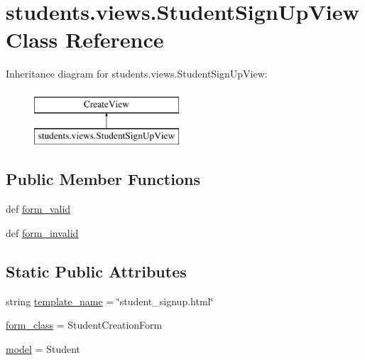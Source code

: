 \hypertarget{classstudents_1_1views_1_1_student_sign_up_view}{\section{students.\-views.\-Student\-Sign\-Up\-View Class Reference}
\label{classstudents_1_1views_1_1_student_sign_up_view}
}
Inheritance diagram for students.\-views.\-Student\-Sign\-Up\-View\-:\begin{figure}[H]
\begin{center}
\leavevmode
\includegraphics[height=2.000000cm]{classstudents_1_1views_1_1_student_sign_up_view}
\end{center}
\end{figure}
\subsection*{Public Member Functions}
\begin{DoxyCompactItemize}
\item 
def \hyperlink{classstudents_1_1views_1_1_student_sign_up_view_af327972736edd8cd1d9df42c6d44c2a1}{form\-\_\-valid}
\item 
def \hyperlink{classstudents_1_1views_1_1_student_sign_up_view_afbf2ab8d301bfa81d6c9800ad4216667}{form\-\_\-invalid}
\end{DoxyCompactItemize}
\subsection*{Static Public Attributes}
\begin{DoxyCompactItemize}
\item 
string \hyperlink{classstudents_1_1views_1_1_student_sign_up_view_aa49ffb02bfbe89afe87587d289fda4f8}{template\-\_\-name} = \char`\"{}student\-\_\-signup.\-html\char`\"{}
\item 
\hyperlink{classstudents_1_1views_1_1_student_sign_up_view_aebf4f6c965e1539de10429369ec3c8df}{form\-\_\-class} = Student\-Creation\-Form
\item 
\hyperlink{classstudents_1_1views_1_1_student_sign_up_view_a4171ad3e9247829642a13c7047f2b8f1}{model} = Student
\end{DoxyCompactItemize}


